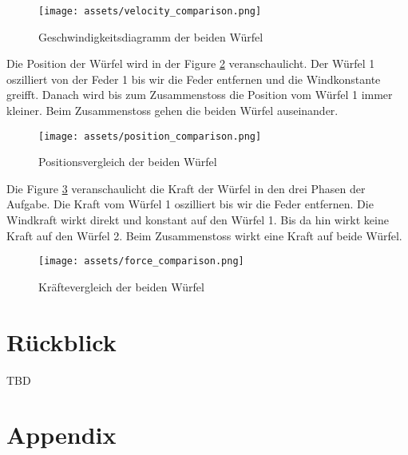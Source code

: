\documentclass{article}
\begin{document}
\vspace{-1em} %
\begin{figure}[H] 
\centering\texttt{[image: assets/velocity\_comparison.png]}
\scriptsize
\caption{Geschwindigkeitsdiagramm der beiden Würfel}
\label{fig:velocity_comparison}
\end{figure}
\noindent
Die Position der Würfel wird in der Figure \ref{fig:position_comparison} veranschaulicht. Der Würfel 1 oszilliert von der Feder 1 bis wir die Feder entfernen und die Windkonstante greifft. Danach wird bis zum Zusammenstoss die Position vom Würfel 1 immer kleiner. Beim Zusammenstoss gehen die beiden Würfel auseinander.

\vspace{-1em} %
\begin{figure}[H] 
\centering\texttt{[image: assets/position\_comparison.png]}
\scriptsize
\caption{Positionsvergleich der beiden Würfel}
\label{fig:position_comparison}
\end{figure}

\noindent
Die Figure \ref{fig:force_comparison} veranschaulicht die Kraft der Würfel in den drei Phasen der Aufgabe. Die Kraft vom Würfel 1 oszilliert bis wir die Feder entfernen. Die Windkraft wirkt direkt und konstant auf den Würfel 1. Bis da hin wirkt keine Kraft auf den Würfel 2. Beim Zusammenstoss wirkt eine Kraft auf beide Würfel.
\begin{figure}[H] 
\centering\texttt{[image: assets/force\_comparison.png]}
\scriptsize
\caption{Kräftevergleich der beiden Würfel}
\label{fig:force_comparison}
\end{figure}

\newpage

\section{Rückblick}
TBD
\newpage

\listoffigures
\clearpage
\normalsize

\newpage

\section{Appendix}
\listoflistings
\normalsize

\clearpage
\appendix
\end{document}
